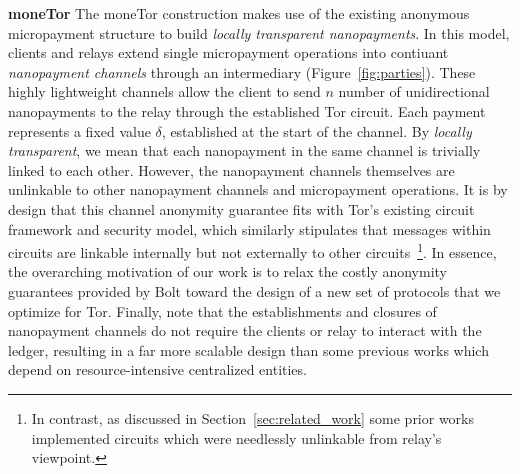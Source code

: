 
\textbf{moneTor} The moneTor construction makes use of the existing anonymous
micropayment structure to build \emph{locally transparent nanopayments}. In this
model, clients and relays extend single micropayment operations into contiuant
\emph{nanopayment channels} through an intermediary (Figure~\ref{fig:parties}).
These highly lightweight channels allow the client to send $n$ number of
unidirectional nanopayments to the relay through the established Tor circuit.
Each payment represents a fixed value $\delta$, established at the start of the
channel. By \emph{locally transparent}, we mean that each nanopayment in the
same channel is trivially linked to each other. However, the nanopayment
channels themselves are unlinkable to other nanopayment channels and
micropayment operations. It is by design that this channel anonymity guarantee
fits with Tor's existing circuit framework and security model, which similarly
stipulates that messages within circuits are linkable internally but not
externally to other circuits~\footnote{In contrast, as discussed in
  Section~\ref{sec:related_work} some prior works implemented circuits which
  were needlessly unlinkable from relay's viewpoint.}. In essence, the
overarching motivation of our work is to relax the costly anonymity guarantees
provided by Bolt toward the design of a new set of protocols that we optimize
for Tor. Finally, note that the establishments and closures of nanopayment
channels do not require the clients or relay to interact with the ledger,
resulting in a far more scalable design than some previous works which depend on
resource-intensive centralized entities.

